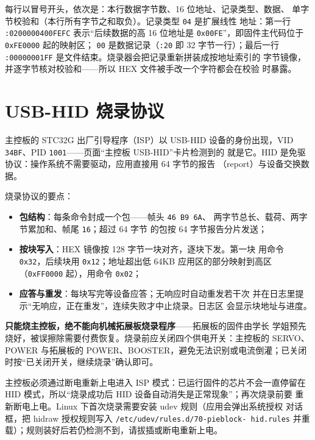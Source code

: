 每行以冒号开头，依次是：本行数据字节数、16 位地址、记录类型、数据、
单字节校验和（本行所有字节之和取负）。记录类型 \texttt{04} 是扩展线性
地址：第一行 \texttt{:0200000400FEFC} 表示“后续数据的高 16 位地址是
\texttt{0x00FE}”，即固件主代码位于 \texttt{0xFE0000} 起的映射区；
\texttt{00} 是数据记录（\texttt{:20} 即 32 字节一行）；最后一行
\texttt{:00000001FF} 是文件结束。烧录器会把记录重新拼装成按地址索引的
字节镜像，并逐字节核对校验和——所以 HEX 文件被手改一个字符都会在校验
时暴露。

\section{USB-HID 烧录协议}

主控板的 STC32G 出厂引导程序（ISP）以 USB-HID 设备的身份出现，VID
\texttt{34BF}、PID \texttt{1001}——页面“主控板 USB-HID”卡片检测到的
就是它。HID 是免驱协议：操作系统不需要驱动，应用直接用 64 字节的报告
（report）与设备交换数据。

烧录协议的要点：

\begin{itemize}
  \item \textbf{包结构}：每条命令封成一个包——帧头 \texttt{46 B9 6A}、
        两字节总长、载荷、两字节累加和、帧尾 \texttt{16}；超过 64 字节
        的包按 64 字节报告分片发送；
  \item \textbf{按块写入}：HEX 镜像按 128 字节一块对齐，逐块下发。第一块
        用命令 \texttt{0x32}，后续块用 \texttt{0x12}；地址超出低 64KB
        应用区的部分映射到高区（\texttt{0xFF0000} 起），用命令
        \texttt{0x02}；
  \item \textbf{应答与重发}：每块写完等设备应答；无响应时自动重发若干次
        并在日志里提示“无响应，正在重发”，连续失败才中止烧录。日志区
        会显示块地址与进度。
\end{itemize}

\begin{note}
\textbf{只能烧主控板，绝不能向机械拓展板烧录程序}——拓展板的固件由学长
学姐预先烧好，被误擦除需要付费恢复。烧录前应关闭四个供电开关：主控板的
SERVO、POWER 与拓展板的 POWER、BOOSTER，避免无法识别或电流倒灌；已关闭
时按“已关闭开关，继续烧录”确认即可。
\end{note}

主控板必须通过断电重新上电进入 ISP 模式：已运行固件的芯片不会一直停留在
HID 模式，所以“烧录成功后 HID 设备自动消失是正常现象”；再次烧录前要
重新断电上电。Linux 下首次烧录需要安装 udev 规则（应用会弹出系统授权
对话框，把 hidraw 授权规则写入 \texttt{/etc/udev/rules.d/70-pieblock-
hid.rules} 并重载）；规则装好后若仍检测不到，请拔插或断电重新上电。

